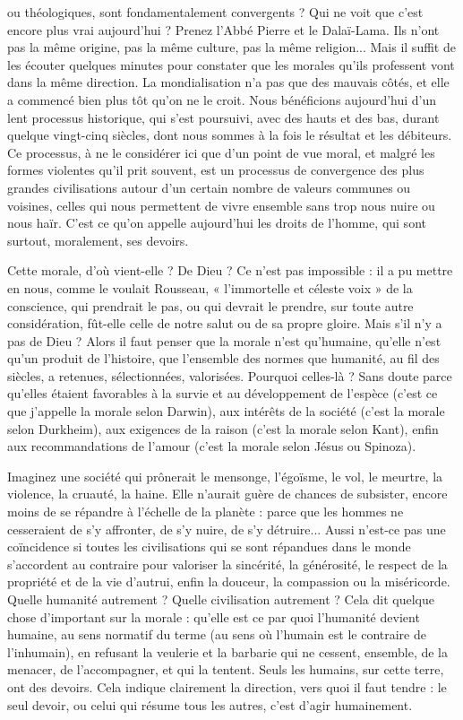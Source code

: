ou théologiques, sont fondamentalement convergents ? Qui ne voit
que c’est encore plus vrai aujourd’hui ? Prenez l'Abbé Pierre et le Dalaï-Lama. Ils
n'ont pas la même origine, pas la même culture, pas la même religion... Mais il
suffit de les écouter quelques minutes pour constater que les morales qu’ils professent
vont dans la même direction. La mondialisation n’a pas que des mauvais
côtés, et elle a commencé bien plus tôt qu’on ne le croit. Nous bénéficions
aujourd’hui d’un lent processus historique, qui s’est poursuivi, avec des hauts et
des bas, durant quelque vingt-cinq siècles, dont nous sommes à la fois le résultat
et les débiteurs. Ce processus, à ne le considérer ici que d’un point de vue moral,
et malgré les formes violentes qu’il prit souvent, est un processus de convergence
des plus grandes civilisations autour d’un certain nombre de valeurs communes
ou voisines, celles qui nous permettent de vivre ensemble sans trop nous nuire ou
nous haïr. C’est ce qu’on appelle aujourd’hui les droits de l’homme, qui sont surtout,
moralement, ses devoirs.

Cette morale, d’où vient-elle ? De Dieu ? Ce n’est pas impossible : il a pu
mettre en nous, comme le voulait Rousseau, « l’immortelle et céleste voix » de
la conscience, qui prendrait le pas, ou qui devrait le prendre, sur toute autre
considération, fût-elle celle de notre salut ou de sa propre gloire. Mais s’il n’y
a pas de Dieu ? Alors il faut penser que la morale n’est qu’humaine, qu’elle
n’est qu'un produit de l’histoire, que l’ensemble des normes que humanité, au
fil des siècles, a retenues, sélectionnées, valorisées. Pourquoi celles-là ? Sans
doute parce qu’elles étaient favorables à la survie et au développement de
l'espèce (c’est ce que j'appelle la morale selon Darwin), aux intérêts de la société
(c’est la morale selon Durkheim), aux exigences de la raison (c’est la morale
selon Kant), enfin aux recommandations de l’amour (c’est la morale selon Jésus
ou Spinoza).

Imaginez une société qui prônerait le mensonge, l’égoïsme, le vol, le
meurtre, la violence, la cruauté, la haine. Elle n'aurait guère de chances de
subsister, encore moins de se répandre à l’échelle de la planète : parce que les
hommes ne cesseraient de s’y affronter, de s’y nuire, de s’y détruire... Aussi
n'est-ce pas une coïncidence si toutes les civilisations qui se sont répandues
dans le monde s'accordent au contraire pour valoriser la sincérité, la générosité,
le respect de la propriété et de la vie d’autrui, enfin la douceur, la compassion
ou la miséricorde. Quelle humanité autrement ? Quelle civilisation autrement ?
Cela dit quelque chose d’important sur la morale : qu’elle est ce par quoi
l'humanité devient humaine, au sens normatif du terme (au sens où l'humain
est le contraire de l’inhumain), en refusant la veulerie et la barbarie qui ne cessent,
ensemble, de la menacer, de l'accompagner, et qui la tentent. Seuls les
humains, sur cette terre, ont des devoirs. Cela indique clairement la direction,
vers quoi il faut tendre : le seul devoir, ou celui qui résume tous les autres, c’est
d’agir humainement.

